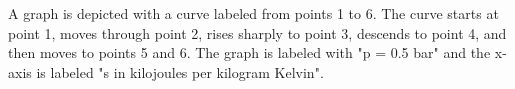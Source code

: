 A graph is depicted with a curve labeled from points 1 to 6. The curve starts at point 1, moves through point 2, rises sharply to point 3, descends to point 4, and then moves to points 5 and 6. The graph is labeled with "p = 0.5 bar" and the x-axis is labeled "s in kilojoules per kilogram Kelvin".
